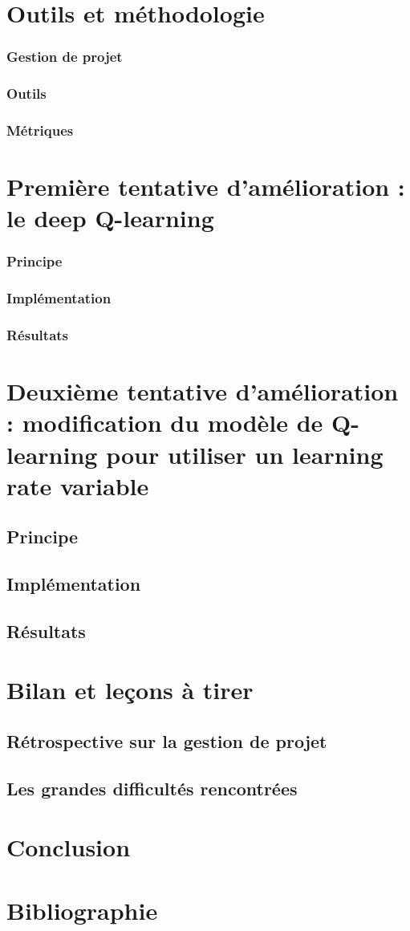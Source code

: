 \documentclass[french]{article}
\begin{document}
    \section{Outils et méthodologie}
    \subsubsection{Gestion de projet}
    \subsubsection{Outils}
    \subsubsection{Métriques}

    \section{Première tentative d'amélioration : le deep Q-learning}
    \subsubsection{Principe}
    \subsubsection{Implémentation}
    \subsubsection{Résultats}

    \section{Deuxième tentative d'amélioration : modification du modèle de Q-learning pour utiliser un learning rate variable}
    \subsection{Principe}
    \subsection{Implémentation}
    \subsection{Résultats}

    \section{Bilan et leçons à tirer}
    \subsection{Rétrospective sur la gestion de projet}
    \subsection{Les grandes difficultés rencontrées}

    \section{Conclusion}

    \section*{Bibliographie}
\end{document}
